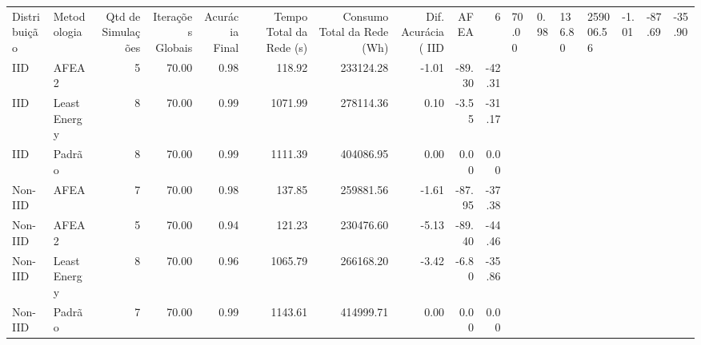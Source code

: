 \begin{tabular}{llrrrrrrrr}
\toprule
Distribuição & Metodologia & Qtd de Simulações & Iterações Globais & Acurácia Final & Tempo Total da Rede (s) & Consumo Total da Rede (Wh) & Dif. Acurácia (%
\midrule
IID & AFEA & 6 & 70.00 & 0.98 & 136.80 & 259006.56 & -1.01 & -87.69 & -35.90 \\
IID & AFEA 2 & 5 & 70.00 & 0.98 & 118.92 & 233124.28 & -1.01 & -89.30 & -42.31 \\
IID & LeastEnergy & 8 & 70.00 & 0.99 & 1071.99 & 278114.36 & 0.10 & -3.55 & -31.17 \\
IID & Padrão & 8 & 70.00 & 0.99 & 1111.39 & 404086.95 & 0.00 & 0.00 & 0.00 \\
Non-IID & AFEA & 7 & 70.00 & 0.98 & 137.85 & 259881.56 & -1.61 & -87.95 & -37.38 \\
Non-IID & AFEA 2 & 5 & 70.00 & 0.94 & 121.23 & 230476.60 & -5.13 & -89.40 & -44.46 \\
Non-IID & LeastEnergy & 8 & 70.00 & 0.96 & 1065.79 & 266168.20 & -3.42 & -6.80 & -35.86 \\
Non-IID & Padrão & 7 & 70.00 & 0.99 & 1143.61 & 414999.71 & 0.00 & 0.00 & 0.00 \\
\bottomrule
\end{tabular}
